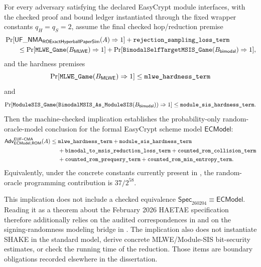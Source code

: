 \begin{theorem}
\label{thm:checked-counted-rom-ledger}
For every adversary satisfying the declared EasyCrypt module interfaces, with
the checked proof and bound ledger instantiated through the fixed wrapper
constants \(q_H=q_S=2\), assume the final checked hop/reduction premise
\[
\begin{aligned}
  &\Pr[\mathsf{UF\_NMA}_{\mathsf{ROExactHyperballPaperSim}}(A)\Rightarrow 1]
  +\texttt{rejection\_sampling\_loss\_term} \\
  &\qquad\le
  \Pr[\texttt{MLWE\_Game}(B_{\mathsf{MLWE}})\Rightarrow 1]
  +
  \Pr[\texttt{BimodalSelfTargetMSIS\_Game}(B_{\mathsf{bimodal}})\Rightarrow 1],
\end{aligned}
\]
and the hardness premises
\[
  \Pr[\texttt{MLWE\_Game}(B_{\mathsf{MLWE}})\Rightarrow 1]
  \le \texttt{mlwe\_hardness\_term}
\]
and
\[
  \Pr[\texttt{ModuleSIS\_Game}
      (\texttt{BimodalMSIS\_As\_ModuleSIS}(B_{\mathsf{bimodal}}))\Rightarrow 1]
  \le \texttt{module\_sis\_hardness\_term}.
\]
Then the machine-checked implication establishes the probability-only
random-oracle-model conclusion for the formal EasyCrypt scheme model
\(\mathsf{ECModel}\):
\[
\begin{aligned}
  \mathsf{Adv}_{\mathsf{ECModel},\mathsf{ROM}}^{\mathsf{EUF}\mbox{-}\mathsf{CMA}}(A)
  \le{}&
  \texttt{mlwe\_hardness\_term}
  +\texttt{module\_sis\_hardness\_term} \\
  &+\texttt{bimodal\_to\_msis\_reduction\_loss\_term}
  +\texttt{counted\_rom\_collision\_term} \\
  &+\texttt{counted\_rom\_prequery\_term}
  +\texttt{counted\_rom\_min\_entropy\_term}.
\end{aligned}
\]
Equivalently, under the concrete constants currently present in
, the random-oracle programming contribution is
\(37/2^{58}\).

This implication does not include a checked equivalence
\(\mathsf{Spec}_{260204}\equiv\mathsf{ECModel}\).  Reading it as a theorem about
the February 2026 HAETAE specification therefore additionally relies on the
audited correspondences in  and on
the signing-randomness modeling bridge in
.  The implication also does not
instantiate SHAKE in the standard model, derive concrete MLWE/Module-SIS
bit-security estimates, or check the running time of the reduction.  Those
items are boundary obligations recorded elsewhere in the dissertation.
\end{theorem}

